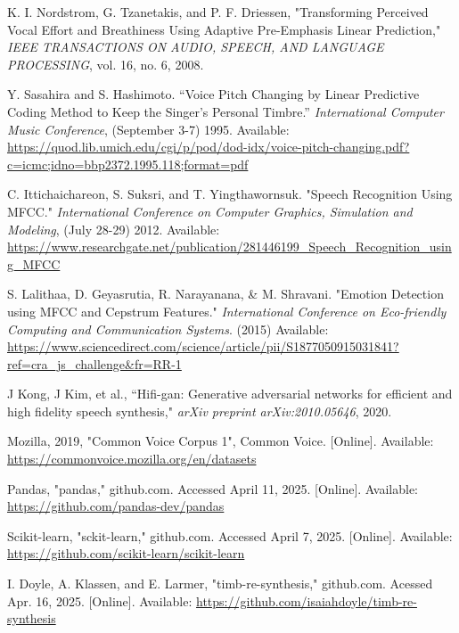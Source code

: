 \documentclass{article}
\begin{document}
\begin{thebibliography}{citations}
K. I. Nordstrom, G. Tzanetakis, and P. F. Driessen, "Transforming Perceived Vocal Effort and Breathiness
Using Adaptive Pre-Emphasis Linear Prediction," \textit{IEEE TRANSACTIONS ON AUDIO, SPEECH, AND LANGUAGE PROCESSING}, vol. 16, no. 6, 2008.

Y. Sasahira and S. Hashimoto. “Voice Pitch Changing by Linear Predictive Coding Method to Keep the Singer’s Personal Timbre.” \textit{International Computer Music Conference}, (September 3-7) 1995. Available: \url{https://quod.lib.umich.edu/cgi/p/pod/dod-idx/voice-pitch-changing.pdf?c=icmc;idno=bbp2372.1995.118;format=pdf}

C. Ittichaichareon, S. Suksri, and T. Yingthawornsuk. "Speech Recognition Using MFCC." \textit{International Conference on Computer Graphics, Simulation and Modeling}, (July 28-29) 2012. Available: \url{https://www.researchgate.net/publication/281446199_Speech_Recognition_using_MFCC}

S. Lalithaa, D. Geyasrutia, R. Narayanana, \& M. Shravani. "Emotion Detection using MFCC and Cepstrum Features." \textit{International Conference on Eco-friendly Computing and Communication Systems}. (2015) Available: \url{https://www.sciencedirect.com/science/article/pii/S1877050915031841?ref=cra_js_challenge&fr=RR-1}

J Kong, J Kim, et al., “Hifi-gan: Generative adversarial networks for efficient and high fidelity speech synthesis," \textit{arXiv preprint arXiv:2010.05646}, 2020.

Mozilla, 2019, "Common Voice Corpus 1", Common Voice. [Online]. Available: \url{https://commonvoice.mozilla.org/en/datasets}

Pandas, "pandas," github.com. Accessed April 11, 2025. [Online]. Available: \url{https://github.com/pandas-dev/pandas}

Scikit-learn, "sckit-learn," github.com. Accessed April 7, 2025. [Online]. Available: \url{https://github.com/scikit-learn/scikit-learn}

I. Doyle, A. Klassen, and E. Larmer, "timb-re-synthesis," github.com. Acessed Apr. 16, 2025. [Online]. Available: \url{https://github.com/isaiahdoyle/timb-re-synthesis}

\end{thebibliography}
\end{document}
